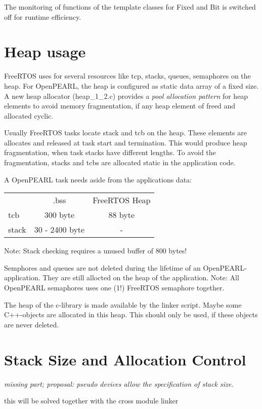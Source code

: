 The monitoring of functions of the template classes for Fixed and Bit 
is switched off for runtime efficiency.

\section{Heap usage}
FreeRTOS uses for several resources like tcp, stacks, queues, semaphores 
on the heap.
For OpenPEARL, the heap is configured as static data array of a fixed size.
A new heap allocator (heap\_1\_2.c) provides a {\em pool allocation pattern}
for heap elements to avoid memory fragmentation, if any heap element
of freed and allocated cyclic.

Usually FreeRTOS tasks locate stack and tcb on the heap. 
These elements are allocates and released at task start and termination.
This would produce heap fragmentation, when task stacks have different lengths.
To avoid the fragmentation, stacks and tcbs are allocated static in the
application code.

A OpenPEARL task needs aside from the applications data:

\begin{tabular}{lcc}
    & .bss & FreeRTOS Heap \\
tcb & 300 byte & 88 byte \\
stack & 30 - 2400 byte & - \\
\end{tabular} 

Note: Stack checking requires a unused buffer of 800 bytes!

Semphores and queues are not deleted during the lifetime of an 
OpenPEARL-application. They are still allocted on the heap of the application.
Note: All OpenPEARL semaphores uses one (1!) FreeRTOS semaphore together.

The heap of the c-library is made available by the linker script. 
Maybe some C++-objects are allocated in this heap.
This should only be used, if these objects are never deleted.


\section{Stack Size and Allocation Control}
{\em missing part; 
proposal: pseudo devices allow the specification of stack size.

this will be solved together with the cross module linker
}

